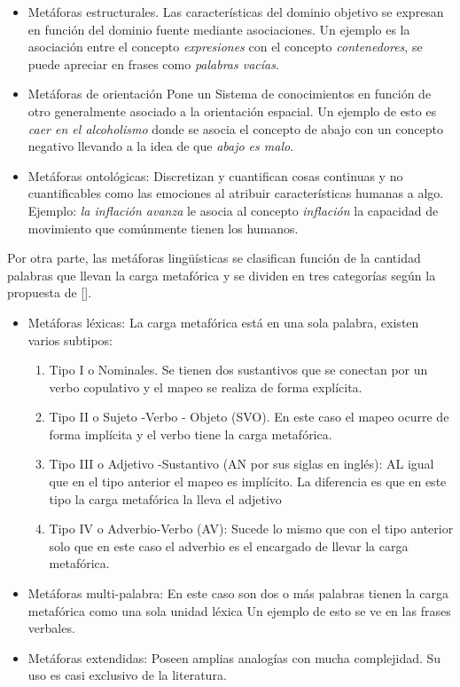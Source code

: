 \begin{itemize}
\item Metáforas estructurales. Las características del dominio objetivo se expresan en función del dominio fuente mediante asociaciones. Un ejemplo es la asociación entre el concepto \textit{expresiones} con el concepto \textit{contenedores}, se puede apreciar en frases como \textit{palabras vacías}.
\item Metáforas de orientación Pone un Sistema de conocimientos en función de otro generalmente asociado a la orientación espacial. Un ejemplo de esto es \textit{caer en el alcoholismo} donde se asocia el concepto de abajo con un concepto negativo llevando a la idea de que \textit{abajo es malo}.
\item Metáforas ontológicas: Discretizan y cuantifican cosas continuas y no cuantificables como las emociones al atribuir características humanas a algo. Ejemplo: \textit{la inflación avanza} le asocia al concepto \textit{inflación} la capacidad de movimiento que comúnmente tienen los humanos.
\end{itemize}

Por otra parte, las metáforas lingüísticas se clasifican función de la cantidad palabras que llevan la carga metafórica y se dividen en tres categorías según la propuesta de [\cite{Sunny}]. 
\begin{itemize}
\item  Metáforas léxicas: La carga metafórica está en una sola palabra, existen varios subtipos:
\begin{enumerate}
\item Tipo I o Nominales. Se tienen dos sustantivos que se conectan por un verbo copulativo y el mapeo se realiza de forma explícita.
\item Tipo II o Sujeto -Verbo - Objeto (SVO). En este caso el mapeo ocurre de forma implícita y el verbo tiene la carga metafórica.
\item Tipo III o Adjetivo -Sustantivo (AN por sus siglas en inglés): AL igual que en el tipo anterior el mapeo es implícito. La diferencia es que en este tipo la carga metafórica la lleva el adjetivo 
\item Tipo IV o Adverbio-Verbo (AV): Sucede lo mismo que con el tipo anterior solo que en este caso el adverbio es el encargado de llevar la carga metafórica.
\end{enumerate}
\item Metáforas multi-palabra: En este caso son dos o más palabras tienen la carga metafórica como una sola unidad léxica Un ejemplo de esto se ve en las frases verbales.
\item Metáforas extendidas: Poseen amplias analogías con mucha complejidad. Su uso es casi exclusivo de la literatura.
\end{itemize}


